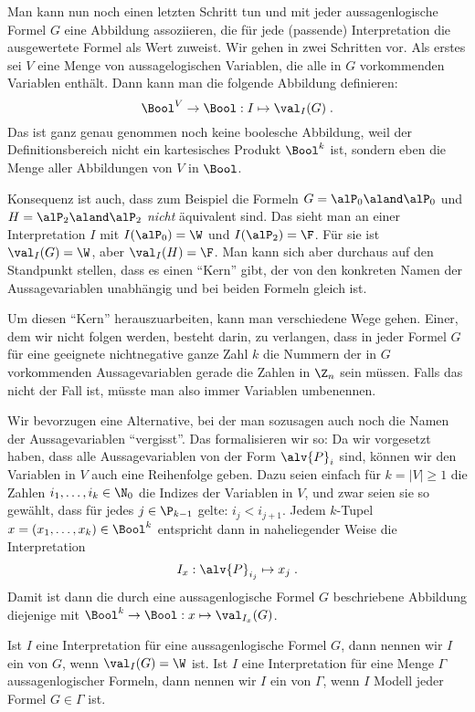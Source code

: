 %
Man kann nun noch einen letzten Schritt tun und mit jeder
aussagenlogische Formel $G$
eine Abbildung assoziieren, die für jede (passende) Interpretation
die ausgewertete Formel als Wert zuweist.
%
Wir gehen in zwei Schritten vor.
%
Als erstes sei $V$ eine Menge von aussagelogischen Variablen, die alle in $G$
vorkommenden Variablen enthält. 
%
Dann kann man die folgende Abbildung definieren:
\[
  \Bool^V \to \Bool : I \mapsto \val_I(G) \;.
\]
%
Das ist ganz genau genommen noch keine boolesche Abbildung, weil der
Definitionsbereich nicht ein kartesisches Produkt $\Bool^k$
ist, sondern eben die Menge aller Abbildungen von $V$ in $\Bool$.

Konsequenz ist auch, dass zum Beispiel die Formeln
$G=\alP_0\aland\alP_0$
und $H= \alP_2\aland\alP_2$ \emph{nicht} äquivalent sind.
%
Das sieht man an einer Interpretation $I$
mit $I(\alP_0)=\W$ und $I(\alP_2)=\F$.
%
Für sie ist $\val_I(G)=\W$, aber $\val_I(H)=\F$.
%
Man kann sich aber durchaus auf den Standpunkt stellen, dass es einen
"`Kern"' gibt, der von den konkreten Namen der Aussagevariablen
unabhängig und bei beiden Formeln gleich ist.

Um diesen "`Kern"' herauszuarbeiten, kann man verschiedene Wege gehen.
%
Einer, dem wir nicht folgen werden, besteht darin, zu verlangen, dass
in jeder Formel $G$
für eine geeignete nichtnegative ganze Zahl $k$
die Nummern der in $G$
vorkommenden Aussagevariablen gerade die Zahlen in $\Z_n$ sein müssen.
%
Falls das nicht der Fall ist, müsste man also immer Variablen
umbenennen.

Wir bevorzugen eine Alternative, bei der man sozusagen auch noch die
Namen der Aussagevariablen "`vergisst"'.
%
Das formalisieren wir so:
%
Da wir vorgesetzt haben, dass alle Aussagevariablen von der Form
$\alv{P}_i$
sind, können wir den Variablen in $V$ auch eine Reihenfolge geben.
%
Dazu seien einfach für $k=|V|\geq 1$
die Zahlen $i_1, \ldots, i_k\in\N_0$
die Indizes der Variablen in $V$,
und zwar seien sie so gewählt, dass für jedes $j\in\P_{k-1}$
gelte: $i_j<i_{j+1}$.
%
Jedem $k$-Tupel
$x=(x_1,\dots,x_k)\in\Bool^k$
entspricht dann in naheliegender Weise die Interpretation
\[
  I_x: \alv{P}_{i_j} \mapsto x_j \;.
\]
%
Damit ist dann die durch eine aussagenlogische Formel $G$
beschriebene Abbildung diejenige mit
$\Bool^k \to \Bool : x \mapsto \val_{I_x}(G)$.

Ist $I$
eine Interpretation für eine aussagenlogische Formel $G$,
dann nennen wir $I$
ein  von $G$, wenn $\val_I(G)=\W$ ist.
%
Ist $I$
eine Interpretation für eine Menge $\Gamma$
aussagenlogischer Formeln, dann nennen wir $I$
ein  von $\Gamma$,
wenn $I$ Modell jeder Formel $G\in \Gamma$ ist.

